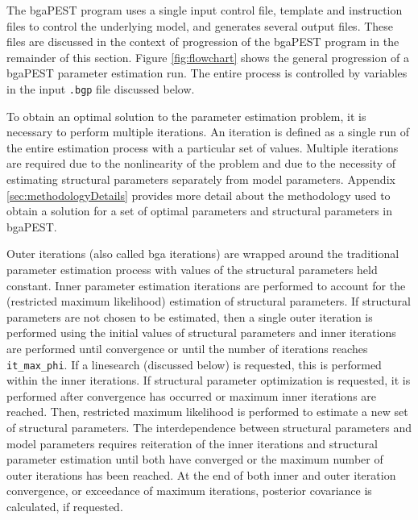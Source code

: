 \documentclass[11pt,oneside,onecolumn]{usgsreport}
\begin{document}
\begin{multicols}{2}
\begin{bibunit}

The bgaPEST program uses a single input control file, template and
instruction files to control the underlying model, and generates several
output files. These files are discussed in the context of progression
of the bgaPEST program in the remainder of this section. Figure \ref{fig:flowchart}
shows the general progression of a bgaPEST parameter estimation run.
The entire process is controlled by variables in the input \texttt{.bgp}
file discussed below. 

To obtain an optimal solution to the parameter estimation problem,
it is necessary to perform multiple iterations. An iteration is defined
as a single run of the entire estimation process with a particular
set of values. Multiple iterations are required due to the nonlinearity
of the problem and due to the necessity of estimating structural parameters
separately from model parameters. Appendix \ref{sec:methodologyDetails}
provides more detail about the methodology used to obtain a solution
for a set of optimal parameters and structural parameters in bgaPEST. 

Outer iterations (also called bga iterations) are wrapped around the
traditional parameter estimation process with values of the structural
parameters held constant. Inner parameter estimation iterations are
performed to account for the (restricted maximum likelihood) estimation
of structural parameters. If structural parameters are not chosen
to be estimated, then a single outer iteration is performed using
the initial values of structural parameters and inner iterations are
performed until convergence or until the number of iterations reaches
\texttt{it\_max\_phi}. If a linesearch (discussed below) is requested,
this is performed within the inner iterations. If structural parameter
optimization is requested, it is performed after convergence has occurred
or maximum inner iterations are reached. Then, restricted maximum
likelihood is performed to estimate a new set of structural parameters.
The interdependence between structural parameters and model parameters
requires reiteration of the inner iterations and structural parameter
estimation until both have converged or the maximum number of outer
iterations has been reached. At the end of both inner and outer iteration
convergence, or exceedance of maximum iterations, posterior covariance
is calculated, if requested.


\end{bibunit}
\end{multicols}
\end{document}
